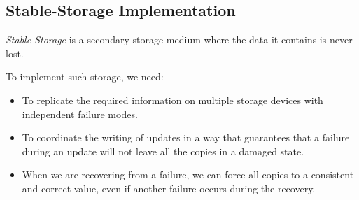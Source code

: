 \subsection{Stable-Storage Implementation}\label{subsec:Stable_Storage_Implementation}
\begin{definition}\label{def:Stable_Storage}
  \emph{Stable-Storage} is a secondary storage medium where the data it contains is never lost.
\end{definition}

To implement such storage, we need:
\begin{itemize}[noitemsep]
\item To replicate the required information on multiple storage devices with independent failure modes.
\item To coordinate the writing of updates in a way that guarantees that a failure during an update will not leave all the copies in a damaged state.
\item When we are recovering from a failure, we can force all copies to a consistent and correct value, even if another failure occurs during the recovery.
\end{itemize}


